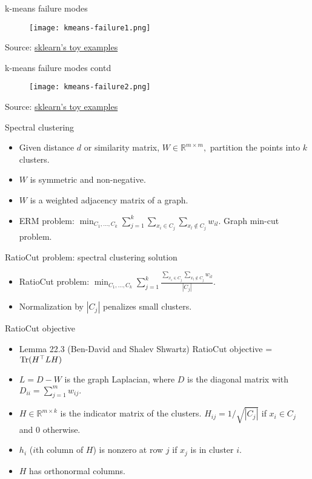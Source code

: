 \documentclass[final]{beamer}
\begin{document}
\begin{frame}{k-means failure modes}
	\begin{figure}
		\texttt{[image: kmeans-failure1.png]}
\end{figure}
	Source: \href{https://scikit-learn.org/stable/auto_examples/cluster/plot_kmeans_assumptions.html\#sphx-glr-auto-examples-cluster-plot-kmeans-assumptions-py}{sklearn's toy examples}
\end{frame}
\begin{frame}{k-means failure modes contd}
	\begin{figure}
	\texttt{[image: kmeans-failure2.png]}
	\end{figure}

	Source: \href{https://scikit-learn.org/stable/auto_examples/cluster/plot_kmeans_assumptions.html\#sphx-glr-auto-examples-cluster-plot-kmeans-assumptions-py}{sklearn's toy examples}
\end{frame}
\begin{frame}{Spectral clustering}
	\begin{itemize}
		\item Given distance $d$ or similarity matrix, $W \in \mathbb{R}^{m\times m},$ partition the points into $k$ clusters.
		\pause
		\item $W$ is symmetric and non-negative.
		\pause
		\item $W$ is a weighted adjacency matrix of a graph.
		\pause
		\item ERM problem: $\min_{C_1, \ldots, C_k} \sum_{j=1}^k \sum_{x_i \in C_j} \sum_{x_l \notin C_j} w_{il}.$ Graph min-cut problem.
	\end{itemize}
\end{frame}
\begin{frame}{RatioCut problem: spectral clustering solution}
	\begin{itemize}
		\item RatioCut problem: $\min_{C_1, \ldots, C_k} \sum_{j=1}^k \frac{\sum_{x_i \in C_j} \sum_{x_l \notin C_j} w_{il}}{|C_j|}.$
		\pause
		\item Normalization by $|C_j|$ penalizes small clusters.
		\pause

	\end{itemize}

\end{frame}
\begin{frame}{RatioCut objective}
	\begin{itemize}
\item Lemma 22.3 (Ben-David and Shalev Shwartz) RatioCut objective = ${\rm Tr}(H^\top L H)$
\pause
	\item $L = D - W$ is the graph Laplacian, where $D$ is the diagonal matrix with $D_{ii} = \sum_{j=1}^m w_{ij}.$
	\pause
\item $H \in \mathbb{R}^{m\times k}$ is the indicator matrix of the clusters. $H_{ij} = 1/\sqrt{|C_j|}$ if $x_i \in C_j$ and $0$ otherwise.
	\pause
	\item $h_i$ ($i$th column of $H$) is nonzero at row $j$ if $x_j$ is in cluster $i$. 
	\pause
	\item $H$ has orthonormal columns.
	\end{itemize}
\end{frame}
\end{document}
